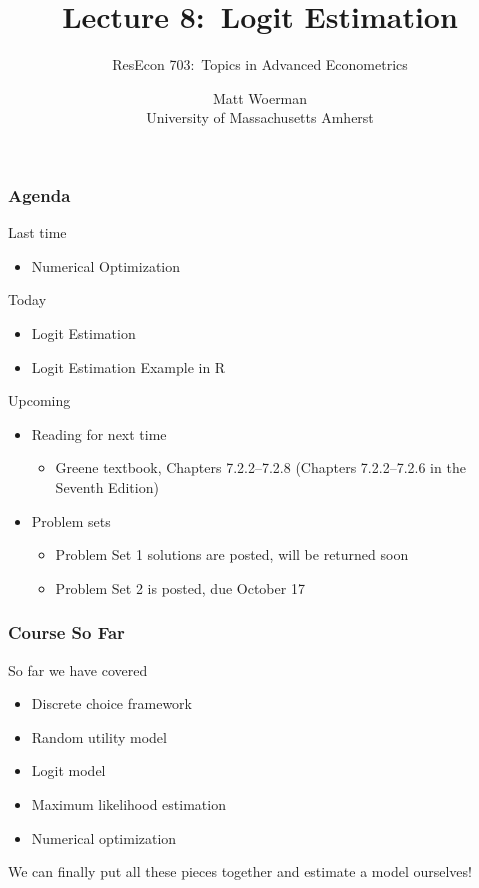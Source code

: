 \documentclass{beamer}
\title[Lecture 8:\ Logit Estimation]{Lecture 8:\ Logit Estimation}
\author[ResEcon 703:\ Advanced Econometrics]{ResEcon 703:\ Topics in Advanced Econometrics}
\date{Matt Woerman\\University of Massachusetts Amherst}
\begin{document}
{ 
\begin{frame}[noframenumbering]
    \titlepage
\end{frame}
}

\begin{frame}\frametitle{Agenda}
    Last time
    \begin{itemize}
        \item Numerical Optimization
    \end{itemize}
    \vspace{2ex}
    Today
    \begin{itemize}
        \item Logit Estimation
        \item Logit Estimation Example in R
    \end{itemize}
    \vspace{2ex}
    Upcoming
    \begin{itemize}
        \item Reading for next time
        \begin{itemize}
            \item Greene textbook, Chapters 7.2.2--7.2.8 (Chapters 7.2.2--7.2.6 in the Seventh Edition)
        \end{itemize}
        \item Problem sets
        \begin{itemize}
            \item Problem Set 1 solutions are posted, will be returned soon
            \item Problem Set 2 is posted, due October 17
        \end{itemize}
    \end{itemize}
\end{frame}

\begin{frame}\frametitle{Course So Far}
    So far we have covered
    \begin{itemize}
    	\item Discrete choice framework
    	\item Random utility model
    	\item Logit model
    	\item Maximum likelihood estimation
    	\item Numerical optimization
    \end{itemize}
    \vspace{3ex}
    We can finally put all these pieces together and estimate a model ourselves!
\end{frame}
\end{document}
